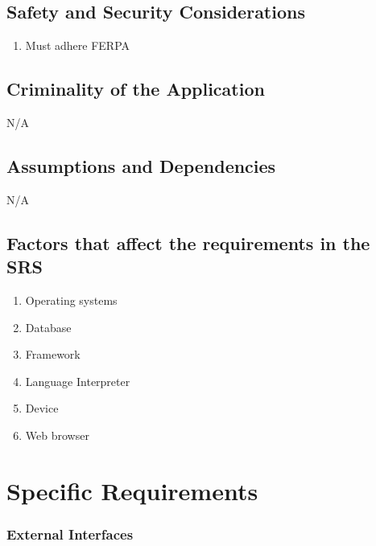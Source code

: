 \documentclass[letterpaper,10pt,titlepage]{article}
\begin{document}
\subsection{Safety and Security Considerations}
\begin{enumerate}
	\item Must adhere FERPA
\end{enumerate}

\subsection{Criminality of the Application}
N/A

\subsection{Assumptions and Dependencies}
N/A

\subsection{Factors that affect the requirements in the SRS}
\begin{enumerate}
	\item Operating systems
	\item Database
	\item Framework
	\item Language Interpreter
	\item Device
	\item Web browser
\end{enumerate}

\section{Specific Requirements}

\subsubsection{External Interfaces}

\end{document}
